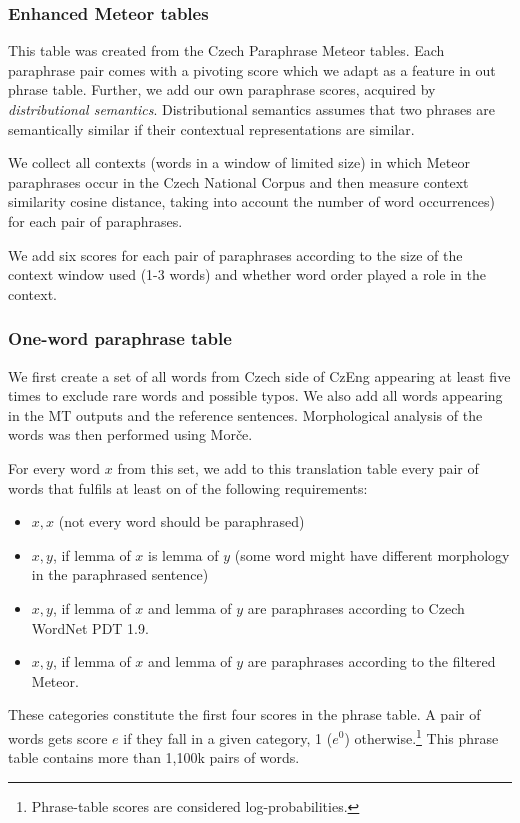 \documentclass[11pt]{article}
\begin{document}
\subsubsection*{Enhanced Meteor tables}
This table was created from the Czech Paraphrase Meteor tables. Each paraphrase 
pair comes with a pivoting score which we adapt as a feature in out phrase 
table. Further, we add our own paraphrase scores, acquired by 
\textit{distributional semantics}. Distributional semantics assumes that two 
phrases are semantically similar if their contextual representations are 
similar. \cite{miller-91}

We collect all contexts (words in a window of limited size) in which Meteor 
paraphrases occur in the Czech National Corpus \cite{SYN2010} and then measure 
context similarity cosine distance, taking into account the number of word 
occurrences) for each pair of paraphrases. 

We add six scores for each pair of paraphrases according to the size of the 
context window used (1-3 words) and whether word order played a role in the 
context. 

\subsubsection*{One-word paraphrase table}
We first create a set of all words from Czech side of CzEng appearing at 
least five times to exclude rare words and possible typos. We also add all 
words appearing in the MT outputs and the reference sentences. Morphological 
analysis of the words was then performed using Morče. 

For every word $ x $ from this set, we add to this translation table every pair 
of words that fulfils at least on of the following requirements:

\begin{itemize}
\item $ x,x $ (not every word should be paraphrased)
\item $ x,y $, if lemma of $ x $ is lemma of $ y $ (some word 
might have different morphology in the paraphrased sentence)
\item $ x,y $, if lemma of $ x $ and lemma of $ y $ are paraphrases according 
to Czech WordNet PDT 1.9.
\item $ x,y $, if lemma of $ x $ and lemma of $ y $ are paraphrases according 
to the filtered Meteor.
\end{itemize}

These categories constitute the first four scores in the phrase table. A pair 
of words gets score $ e $ if they fall in a given category, 1 ($e^0$) 
otherwise.\footnote{Phrase-table scores are considered log-probabilities.} 
This phrase table contains more than 1,100k pairs of words.
\end{document}
